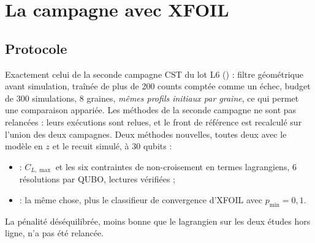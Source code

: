\chapter{La campagne avec XFOIL}\label{ch:campagne}

\section{Protocole}
Exactement celui de la seconde campagne CST du lot L6 () : filtre géométrique avant simulation, traînée de plus de 200 counts comptée comme un échec, budget de 300 simulations, 8 graines, \emph{mêmes profils initiaux par graine}, ce qui permet une comparaison appariée. Les méthodes de la seconde campagne ne sont pas relancées : leurs exécutions sont relues, et le front de référence est recalculé sur l'union des deux campagnes. Deux méthodes nouvelles, toutes deux avec le modèle en $z$ et le recuit simulé, à 30 qubits :
\begin{itemize}
\item {} : $C_{L,\max}$ et les six contraintes de non-croisement en termes lagrangiens, 6 résolutions par QUBO, lectures vérifiées ;
\item {} : la même chose, plus le classifieur de convergence d'XFOIL avec $p_{\min}=0{,}1$.
\end{itemize}
La pénalité déséquilibrée, moins bonne que le lagrangien sur les deux études hors ligne, n'a pas été relancée.

